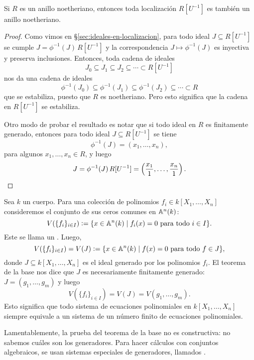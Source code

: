 \begin{proposicion}
  Si $R$ es un anillo noetheriano, entonces toda localización $R [U^{-1}]$
  es también un anillo noetheriano.

  \begin{proof}
    Como vimos en \S\ref{sec:ideales-en-localizacion}, para todo ideal
    $J \subseteq R [U^{-1}]$ se cumple $J = \phi^{-1} (J)\,R [U^{-1}]$ y
    la correspondencia $J \mapsto \phi^{-1} (J)$ es inyectiva y preserva
    inclusiones. Entonces, toda cadena de ideales
    $$J_0 \subseteq J_1 \subseteq J_2 \subseteq \cdots \subset R [U^{-1}]$$
    nos da una cadena de ideales
    \[ \phi^{-1} (J_0) \subseteq \phi^{-1} (J_1) \subseteq
       \phi^{-1} (J_2) \subseteq \cdots \subset R \]
    que se estabiliza, puesto que $R$ es noetheriano. Pero esto significa que
    la cadena en $R [U^{-1}]$ se estabiliza.

    Otro modo de probar el resultado es notar que si todo ideal en $R$
    es finitamente generado, entonces para todo ideal $J \subseteq R [U^{-1}]$
    se tiene
    $$\phi^{-1} (J) = (x_1,\ldots,x_n),$$
    para algunos $x_1,\ldots,x_n \in R$, y luego
    \[ J = \phi^{-1} (J)\,R [U^{-1}] =
           \left(\frac{x_1}{1},\ldots,\frac{x_n}{1}\right). \qedhere \]
  \end{proof}
\end{proposicion}

\begin{ejemplo}
  Sea $k$ un cuerpo. Para una colección de polinomios
  $f_i \in k [X_1,\ldots,X_n]$ consideremos el conjunto de sus ceros comunes
  en $\AA^n (k)$:
  \[ V ( \{ f_i \}_{i\in I} ) \dfn \{ x\in \AA^n (k) \mid
                                     f_i (x) = 0\text{ para todo }i\in I \}. \]
  Este se llama un . Luego,
  \[ V ( \{ f_i \}_{i\in I}) =
     V (J) \dfn \{ x\in \AA^n (k) \mid f (x) = 0\text{ para todo }f\in J \}, \]
  donde $J \subseteq k [X_1,\ldots,X_n]$ es el ideal generado por los polinomios
  $f_i$. El teorema de la base nos dice que $J$ es necesariamente finitamente
  generado: $J = (g_1,\ldots,g_m)$ y luego
  $$V ( \{ f_i \}_{i\in I}) = V (J) = V (g_1,\ldots,g_m).$$
  Esto significa que todo sistema de ecuaciones polinomiales
  en $k [X_1,\ldots,X_n]$ siempre equivale a un sistema de un número finito
  de ecuaciones polinomiales.

  Lamentablemente, la prueba del teorema de la base no es constructiva:
  no sabemos cuáles son los generadores. Para hacer cálculos con conjuntos
  algebraicos, se usan sistemas especiales de generadores, llamados .
\end{ejemplo}


